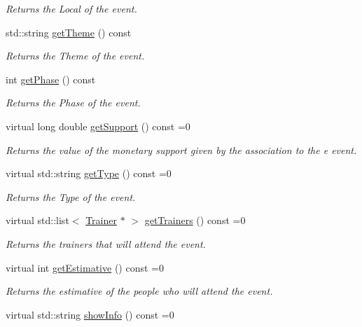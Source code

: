 \begin{DoxyCompactItemize}
\begin{DoxyCompactList}\small\item\em Returns the Local of the event. \end{DoxyCompactList}\item 
std\+::string \mbox{\hyperlink{classEvent_ad83e88dd2fe78a6840dd2c71d217b490}{get\+Theme}} () const
\begin{DoxyCompactList}\small\item\em Returns the Theme of the event. \end{DoxyCompactList}\item 
int \mbox{\hyperlink{classEvent_a1f6eac3425718082f5445a46a236b837}{get\+Phase}} () const
\begin{DoxyCompactList}\small\item\em Returns the Phase of the event. \end{DoxyCompactList}\item 
virtual long double \mbox{\hyperlink{classEvent_a9170bfcbd9b00015dafc5d5cc69a2cfe}{get\+Support}} () const =0
\begin{DoxyCompactList}\small\item\em Returns the value of the monetary support given by the association to the e event. \end{DoxyCompactList}\item 
virtual std\+::string \mbox{\hyperlink{classEvent_a224dbd9a9aee5937ba0c8ea1a056af1f}{get\+Type}} () const =0
\begin{DoxyCompactList}\small\item\em Returns the Type of the event. \end{DoxyCompactList}\item 
virtual std\+::list$<$ \mbox{\hyperlink{classTrainer}{Trainer}} $\ast$ $>$ \mbox{\hyperlink{classEvent_a11aad3e5a7ee85bc61b6811d050c5d70}{get\+Trainers}} () const =0
\begin{DoxyCompactList}\small\item\em Returns the trainers that will attend the event. \end{DoxyCompactList}\item 
virtual int \mbox{\hyperlink{classEvent_a18ac55c239f648fc0ad5687c426f2a8f}{get\+Estimative}} () const =0
\begin{DoxyCompactList}\small\item\em Returns the estimative of the people who will attend the event. \end{DoxyCompactList}\item 
virtual std\+::string \mbox{\hyperlink{classEvent_aaa38f467e933c57190d43351bdb817be}{show\+Info}} () const =0

\end{DoxyCompactItemize}
